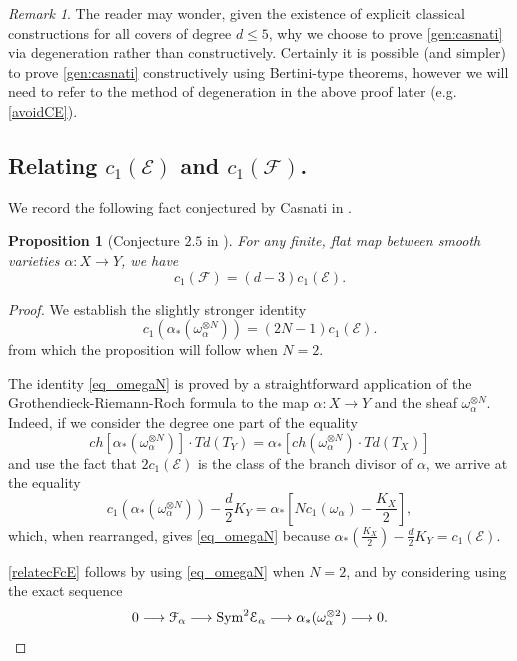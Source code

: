 \documentclass[reqno, 10 pt]{article}
\newtheorem{prop}[thm]{Proposition}
\theoremstyle{definition}
\theoremstyle{remark}
\newtheorem{rmk}[thm]{Remark}
\numberwithin{equation}{section}
\numberwithin{thm}{section}
\numberwithin{prop}{section}
\numberwithin{lem}{section}
\numberwithin{cor}{section}
\numberwithin{conj}{section}
\numberwithin{defn}{section}
\renewcommand{\to}{\longrightarrow}
\newcommand{\cE}{{\mathcal E}}
\newcommand{\cF}{{\mathcal F}}
\newcommand {\from}{{\colon}}
\newcommand {\Sym}{{\rm Sym}}
\begin{document}
\begin{rmk}
The reader may wonder, given the existence of explicit classical constructions for all covers of degree $d\leq 5$, why we choose to prove \autoref{gen:casnati} via degeneration rather than constructively.  Certainly it is possible (and simpler) to prove \autoref{gen:casnati} constructively using Bertini-type theorems, however we will need to refer to the method of degeneration in the above proof later (e.g. \autoref{avoidCE}).
\end{rmk}


\subsection{Relating $c_{1}(\cE)$ and $c_{1}(\cF)$.}
We record the following fact conjectured by Casnati in \cite{Casnati-bielliptic}.  


\begin{prop}[Conjecture $2.5$ in \cite{Casnati-bielliptic}]\label{relatecFcE}
For any finite, flat map between smooth varieties $\alpha \from X \to Y$, we have 
\[c_1(\cF) = (d-3)c_1(\cE).\]
\end{prop}
\begin{proof}
We establish the slightly stronger identity
\begin{equation}\label{eq_omegaN}
c_{1}(\alpha_{*}(\omega_{\alpha}^{\otimes N})) = (2N-1)c_{1}(\cE).
\end{equation} from which the proposition will follow when $N = 2$.

The identity \ref{eq_omegaN} is proved by a straightforward application of the Grothendieck-Riemann-Roch formula to the map $\alpha \from X \to Y$ and the sheaf $\omega^{\otimes N}_{\alpha}.$  Indeed, if we consider the degree one part of the equality 
\[ch[\alpha_{*}(\omega_{\alpha}^{\otimes N})]\cdot Td(T_{Y}) = \alpha_{*}[ch(\omega_{\alpha}^{\otimes N})\cdot Td(T_X)]\] and use the fact that $2c_{1}(\cE)$ is the class of the branch divisor of $\alpha$, we arrive at the equality 
\[c_1(\alpha_{*}(\omega_{\alpha}^{\otimes N})) - \frac{d}{2}K_{Y} = \alpha_{*}[Nc_{1}(\omega_{\alpha}) - \frac{K_{X}}{2}], \] which, when rearranged, gives \eqref{eq_omegaN} because $\alpha_{*}(\frac{K_{X}}{2}) - \frac{d}{2}K_{Y} = c_{1}(\cE)$.

\autoref{relatecFcE} follows by using \eqref{eq_omegaN} when $N = 2$, and by considering using the exact sequence \[0 \to \cF_{\alpha} \to \Sym^{2} \cE_{\alpha} \to \alpha_{*}(\omega_{\alpha}^{\otimes 2}) \to 0.\] 


\end{proof}
\end{document}
